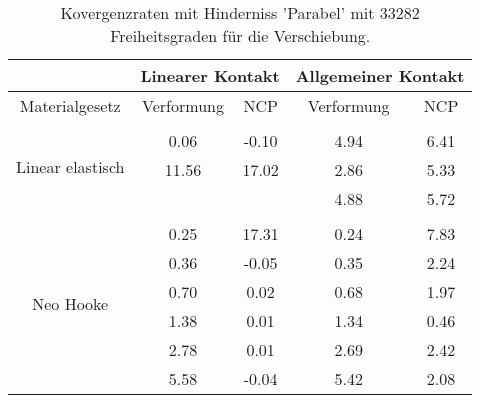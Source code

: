 \begin{table} 
\centering 
\begin{tabular}{c|cc|cc|} 
\cline{2-5} 
 & \multicolumn{2}{|c|}{Linearer Kontakt} & \multicolumn{2}{|c|}{Allgemeiner Kontakt} \\ 
\hline 
\multicolumn{1}{|c|}{Materialgesetz} & \multicolumn{1}{c|}{Verformung} & \multicolumn{1}{c|}{NCP} & \multicolumn{1}{c|}{Verformung} & \multicolumn{1}{c|}{NCP} \\ 
\hline 
\multicolumn{1}{|c|}{\multirow{4}{*}{Linear elastisch}} &\multicolumn{1}{|c|}{} & \multicolumn{1}{|c|}{} & \multicolumn{1}{|c|}{} & \multicolumn{1}{|c|}{} \\ 
\multicolumn{1}{|c|}{} & \multicolumn{1}{|c|}{      0.06} & \multicolumn{1}{|c|}{     -0.10} & \multicolumn{1}{|c|}{      4.94} & \multicolumn{1}{|c|}{      6.41} \\ 
\multicolumn{1}{|c|}{} & \multicolumn{1}{|c|}{     11.56} & \multicolumn{1}{|c|}{     17.02} & \multicolumn{1}{|c|}{      2.86} & \multicolumn{1}{|c|}{      5.33} \\ 
\multicolumn{1}{|c|}{} & \multicolumn{1}{|c|}{} & \multicolumn{1}{|c|}{} & \multicolumn{1}{|c|}{      4.88} & \multicolumn{1}{|c|}{      5.72} \\ 
\hline 
\multicolumn{1}{|c|}{\multirow{7}{*}{Neo Hooke}} &\multicolumn{1}{|c|}{} & \multicolumn{1}{|c|}{} & \multicolumn{1}{|c|}{} & \multicolumn{1}{|c|}{} \\ 
\multicolumn{1}{|c|}{} & \multicolumn{1}{|c|}{      0.25} & \multicolumn{1}{|c|}{     17.31} & \multicolumn{1}{|c|}{      0.24} & \multicolumn{1}{|c|}{      7.83} \\ 
\multicolumn{1}{|c|}{} & \multicolumn{1}{|c|}{      0.36} & \multicolumn{1}{|c|}{     -0.05} & \multicolumn{1}{|c|}{      0.35} & \multicolumn{1}{|c|}{      2.24} \\ 
\multicolumn{1}{|c|}{} & \multicolumn{1}{|c|}{      0.70} & \multicolumn{1}{|c|}{      0.02} & \multicolumn{1}{|c|}{      0.68} & \multicolumn{1}{|c|}{      1.97} \\ 
\multicolumn{1}{|c|}{} & \multicolumn{1}{|c|}{      1.38} & \multicolumn{1}{|c|}{      0.01} & \multicolumn{1}{|c|}{      1.34} & \multicolumn{1}{|c|}{      0.46} \\ 
\multicolumn{1}{|c|}{} & \multicolumn{1}{|c|}{      2.78} & \multicolumn{1}{|c|}{      0.01} & \multicolumn{1}{|c|}{      2.69} & \multicolumn{1}{|c|}{      2.42} \\ 
\multicolumn{1}{|c|}{} & \multicolumn{1}{|c|}{      5.58} & \multicolumn{1}{|c|}{     -0.04} & \multicolumn{1}{|c|}{      5.42} & \multicolumn{1}{|c|}{      2.08} \\ 
\hline 
\end{tabular}\caption{Kovergenzraten mit Hinderniss 'Parabel' mit 33282 Freiheitsgraden für die Verschiebung.}\label{tab:Rate_Parabel_level6}
\end{table} 
